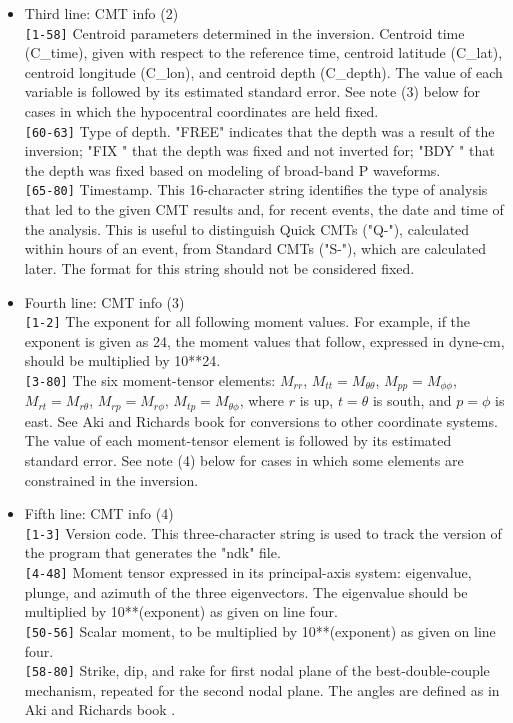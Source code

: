 \begin{itemize}
\item Third line: CMT info (2)\\
\verb|[1-58]|  Centroid parameters determined in the inversion. Centroid time ({\python C\_time}), given
        with respect to the reference time, centroid latitude ({\python C\_lat}), 
        centroid longitude ({\python C\_lon}), and centroid depth ({\python C\_depth}). 
        The value of each variable is followed
        by its estimated standard error. See note (3) below for cases in
        which the hypocentral coordinates are held fixed.\\
\verb|[60-63]| Type of depth. "FREE" indicates that the depth was a result of the
        inversion; "FIX " that the depth was fixed and not inverted for;
        "BDY " that the depth was fixed based on modeling of broad-band 
        P waveforms.\\
\verb|[65-80]| Timestamp. This 16-character string identifies the type of analysis that
        led to the given CMT results and, for recent events, the date and 
        time of the analysis. This is useful to distinguish Quick CMTs ("Q-"), 
        calculated within hours of an event, from Standard CMTs ("S-"), which 
        are calculated later. The format for this string should not be 
        considered fixed.

\item Fourth line: CMT info (3)\\
\verb|[1-2]| The exponent for all following moment values. For example, if the
        exponent is given as 24, the moment values that follow, expressed in 
        dyne-cm, should be multiplied by 10**24.\\
\verb|[3-80]| The six moment-tensor elements: $M_{rr}$, $M_{tt}=M_{\theta\theta}$, 
        $M_{pp}=M_{\phi\phi}$, $M_{rt}=M_{r\theta}$, $M_{rp}=M_{r\phi}$, $M_{tp}=M_{\theta\phi}$, 
        where $r$ is up, $t=\theta$ is south, and $p=\phi$ is east. 
        See Aki and Richards book \cite{akirichards}
        for conversions to other coordinate systems. The value of each moment-tensor
        element is followed by its estimated standard error. See note (4)
        below for cases in which some elements are constrained in the inversion.
        
\item Fifth line: CMT info (4)\\
\verb|[1-3]|   Version code. This three-character string is used to track the version 
        of the program that generates the "ndk" file.\\
\verb|[4-48]|  Moment tensor expressed in its principal-axis system: eigenvalue, 
        plunge, and azimuth of the three eigenvectors. The eigenvalue should be
        multiplied by 10**(exponent) as given on line four.\\
\verb|[50-56]| Scalar moment, to be multiplied by 10**(exponent) as given on line four.\\
\verb|[58-80]| Strike, dip, and rake for first nodal plane of the best-double-couple 
        mechanism, repeated for the second nodal plane. The angles are defined
        as in Aki and Richards book \cite{akirichards}.

\end{itemize}
          
